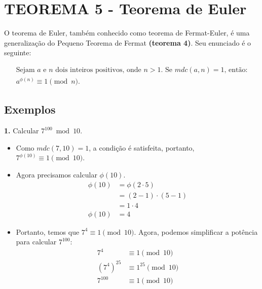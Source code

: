 \section*{TEOREMA 5 - Teorema de Euler}
O teorema de Euler, também conhecido como teorema de Fermat-Euler, é uma generalização do Pequeno Teorema de Fermat \textbf{(teorema 4)}. Seu enunciado é o seguinte:

\begin{gather*}
    \text{Sejam $a$ e $n$ dois inteiros positivos, onde $n>1$. Se $mdc(a,n) = 1$, então:}\\
    a^{\phi(n)} \equiv 1 \pmod {n}\text{.}
\end{gather*}

\vspace{12pt}

\subsection*{Exemplos}
\textbf{1.} Calcular $7^{100} \bmod 10$.

\begin{itemize}
    \item Como $mdc(7,10) = 1$, a condição é satisfeita, portanto, $7^{\phi(10)} \equiv 1 \pmod {10}$.
    \item Agora precisamos calcular $\phi(10)$.
          \begin{align*}
              \phi(10) & = \phi (2 \cdot 5)  \\
                       & = (2-1) \cdot (5-1) \\
                       & = 1 \cdot 4         \\
              \phi(10) & = 4
          \end{align*}
    \item Portanto, temos que $7^{4} \equiv 1 \pmod {10}$. Agora, podemos simplificar a potência para calcular $7^{100}$:
          \begin{align*}
              7^{4}        & \equiv 1 \pmod {10}      \\
              (7^{4})^{25} & \equiv 1^{25} \pmod {10} \\
              7^{100}      & \equiv 1 \pmod {10}
          \end{align*}
\end{itemize}